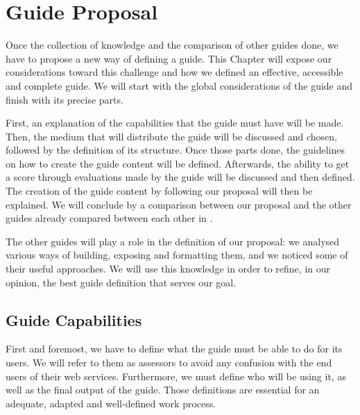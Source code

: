 \chapter{Guide Proposal}
\label{chap:proposal}

Once the collection of knowledge and the comparison of other guides done, we have to propose a new way of defining a guide. This Chapter will expose our considerations toward this challenge and how we defined an effective, accessible and complete guide. We will start with the global considerations of the guide and finish with its precise parts.

First, an explanation of the capabilities that the guide must have will be made. Then, the medium that will distribute the guide will be discussed and chosen, followed by the definition of its structure. Once those parts done, the guidelines on how to create the guide content will be defined. Afterwards, the ability to get a score through evaluations made by the guide will be discussed and then defined. The creation of the guide content by following our proposal will then be explained. We will conclude by a comparison between our proposal and the other guides already compared between each other in .

The other guides will play a role in the definition of our proposal: we analysed various ways of building, exposing and formatting them, and we noticed some of their useful approaches. We will use this knowledge in order to refine, in our opinion, the best guide definition that serves our goal.

\minitoc

\newpage

\section{Guide Capabilities}
\label{sec:proposal_capabilties}

First and foremost, we have to define what the guide must be able to do for its users. We will refer to them as assessors to avoid any confusion with the end users of their web services. Furthermore, we must define who will be using it, as well as the final output of the guide. Those definitions are essential for an adequate, adapted and well-defined work process.


